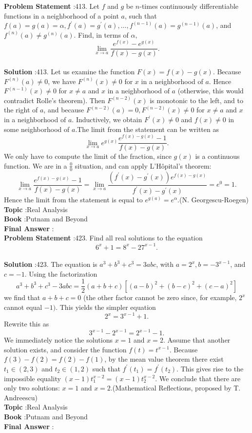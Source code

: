 \documentclass[10pt]{article}
\begin{document}
\textbf{Problem Statement} :413. Let $f$ and $g$ be $n$-times continuously differentiable functions in a neighborhood of a point $a$, such that $f(a)=g(a)=\alpha, f^{\prime}(a)=g^{\prime}(a), \ldots, f^{(n-1)}(a)=g^{(n-1)}(a)$, and $f^{(n)}(a) \neq g^{(n)}(a)$. Find, in terms of $\alpha$,$$ \lim _{x \rightarrow a} \frac{e^{f(x)}-e^{g(x)}}{f(x)-g(x)} . $$\\
\textbf{Solution} :413. Let us examine the function $F(x)=f(x)-g(x)$. Because $F^{(n)}(a) \neq 0$, we have $F^{(n)}(x) \neq 0$ for $x$ in a neighborhood of $a$. Hence $F^{(n-1)}(x) \neq 0$ for $x \neq a$ and $x$ in a neighborhood of $a$ (otherwise, this would contradict Rolle's theorem). Then $F^{(n-2)}(x)$ is monotonic to the left, and to the right of $a$, and because $F^{(n-2)}(a)=0, F^{(n-2)}(x) \neq 0$ for $x \neq a$ and $x$ in a neighborhood of $a$. Inductively, we obtain $F^{\prime}(x) \neq 0$ and $f(x) \neq 0$ in some neighborhood of $a$.The limit from the statement can be written as$$ \lim _{x \rightarrow a} e^{g(x)} \frac{e^{f(x)-g(x)}-1}{f(x)-g(x)} . $$We only have to compute the limit of the fraction, since $g(x)$ is a continuous function. We are in a $\frac{0}{0}$ situation, and can apply L'Hôpital's theorem:$$ \lim _{x \rightarrow a} \frac{e^{f(x)-g(x)}-1}{f(x)-g(x)}=\lim _{x \rightarrow a} \frac{\left(f^{\prime}(x)-g^{\prime}(x)\right) e^{f(x)-g(x)}}{f^{\prime}(x)-g^{\prime}(x)}=e^{0}=1 . $$Hence the limit from the statement is equal to $e^{g(a)}=e^{\alpha}$.(N. Georgescu-Roegen)\\
\textbf{Topic} :Real Analysis\\
\textbf{Book} :Putnam and Beyond\\
\textbf{Final Answer} :\\


\textbf{Problem Statement} :423. Find all real solutions to the equation$$ 6^{x}+1=8^{x}-27^{x-1} . $$\\
\textbf{Solution} :423. The equation is $a^{3}+b^{3}+c^{3}=3 a b c$, with $a=2^{x}, b=-3^{x-1}$, and $c=-1$. Using the factorization$$ a^{3}+b^{3}+c^{3}-3 a b c=\frac{1}{2}(a+b+c)\left[(a-b)^{2}+(b-c)^{2}+(c-a)^{2}\right] $$we find that $a+b+c=0$ (the other factor cannot be zero since, for example, $2^{x}$ cannot equal $-1)$. This yields the simpler equation$$ 2^{x}=3^{x-1}+1 . $$Rewrite this as$$ 3^{x-1}-2^{x-1}=2^{x-1}-1 . $$We immediately notice the solutions $x=1$ and $x=2$. Assume that another solution exists, and consider the function $f(t)=t^{x-1}$. Because $f(3)-f(2)=f(2)-f(1)$, by the mean value theorem there exist $t_{1} \in(2,3)$ and $t_{2} \in(1,2)$ such that $f^{\prime}\left(t_{1}\right)=f^{\prime}\left(t_{2}\right)$. This gives rise to the impossible equality $(x-1) t_{1}^{x-2}=(x-1) t_{2}^{x-2}$. We conclude that there are only two solutions: $x=1$ and $x=2$.(Mathematical Reflections, proposed by T. Andreescu) \\
\textbf{Topic} :Real Analysis\\
\textbf{Book} :Putnam and Beyond\\
\textbf{Final Answer} :\\
\end{document}
